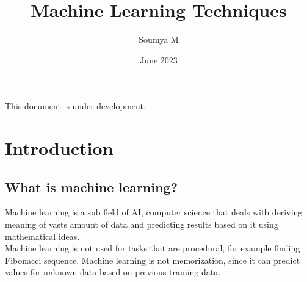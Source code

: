 \documentclass[12pt,a4paper]{article}
\title{Machine Learning Techniques}
\author{Soumya M}
\date{June 2023}
\begin{document}
\maketitle
This document is under development.

\tableofcontents
\newpage

\section{Introduction}
\subsection{What is machine learning?}
Machine learning is a sub field of AI, computer science that deals with deriving meaning of vasts amount of data and predicting results based on it using mathematical ideas.\\
Machine learning is not used for tasks that are procedural, for example finding Fibonacci sequence. Machine learning is not memorization, since it can predict values for unknown data based on previous training data. 
\end{document}
